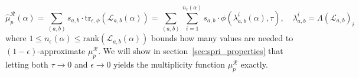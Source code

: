 \documentclass[10pt]{article}
\newenvironment{boxedenumerate}
  {\begin{mdframed}[font=\small, linewidth=1pt]}
  {\end{mdframed}}
\numberwithin{equation}{section}
\newcommand{\+}{%
	\raisebox{0.18ex}{\scaleobj{0.55}{+}}
}
\newcommand\restr[2]{{%
  \left.\kern-\nulldelimiterspace %
  #1 %
  \vphantom{\big|} %
  \right|_{#2} %
  }}
\theoremstyle{definition}
\theoremstyle{definition}
\begin{document}
\begin{boxedenumerate}
\begin{enumerate}
	$$
	\hat{\mu}^\mathcal{R}_p(\alpha) = \sum\limits_{(a,b)} s_{a,b} \cdot \mathrm{tr}_{\epsilon, \phi}(\mathcal{L}_{a,b}(\alpha)) = \sum\limits_{(a,b)}\sum\limits_{i=1}^{n_\epsilon(\alpha)} s_{a,b} \cdot \phi(\lambda_{a,b}^{i}(\alpha), \tau), \quad \lambda_{a,b}^{i} = \Lambda(\mathcal{L}_{a,b})_i
	$$
	where $1 \leq n_\epsilon(\alpha) \leq \mathrm{rank}(\mathcal{L}_{a,b}(\alpha))$ bounds how many values are needed to $(1-\epsilon)$-approximate $\mu_p^\mathcal{R}$. 
	We will show in section~\ref{sec:spri_properties} that letting both $\tau \to 0$ and $\epsilon \to 0$ yields the multiplicity function $\mu_p^\mathcal{R}$ exactly.
\end{enumerate}
\end{boxedenumerate}
\end{document}
